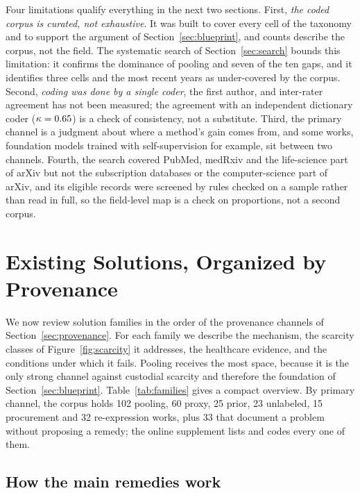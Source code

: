 \documentclass[acmsmall,screen,review]{acmart}
\theoremstyle{acmdefinition}
\begin{document}
Four limitations qualify everything in the next two sections. First, \emph{the coded corpus is curated, not exhaustive}. It was built to cover every cell of the taxonomy and to support the argument of Section~\ref{sec:blueprint}, and counts describe the corpus, not the field. The systematic search of Section~\ref{sec:search} bounds this limitation: it confirms the dominance of pooling and seven of the ten gaps, and it identifies three cells and the most recent years as under-covered by the corpus. Second, \emph{coding was done by a single coder}, the first author, and inter-rater agreement has not been measured; the agreement with an independent dictionary coder ($\kappa=0.65$) is a check of consistency, not a substitute. Third, the primary channel is a judgment about where a method's gain comes from, and some works, foundation models trained with self-supervision for example, sit between two channels. Fourth, the search covered PubMed, medRxiv and the life-science part of arXiv but not the subscription databases or the computer-science part of arXiv, and its eligible records were screened by rules checked on a sample rather than read in full, so the field-level map is a check on proportions, not a second corpus.

\section{Existing Solutions, Organized by Provenance}\label{sec:solutions}

 We now review solution families in the order of the provenance channels of Section~\ref{sec:provenance}. For each family we describe the mechanism, the scarcity classes of Figure~\ref{fig:scarcity} it addresses, the healthcare evidence, and the conditions under which it fails. Pooling receives the most space, because it is the only strong channel against custodial scarcity and therefore the foundation of Section~\ref{sec:blueprint}. Table~\ref{tab:families} gives a compact overview. By primary channel, the corpus holds 102 pooling, 60 proxy, 25 prior, 23 unlabeled, 15 procurement and 32 re-expression works, plus 33 that document a problem without proposing a remedy; the online supplement lists and codes every one of them.

\subsection{How the main remedies work}\label{sec:primer}
\end{document}

